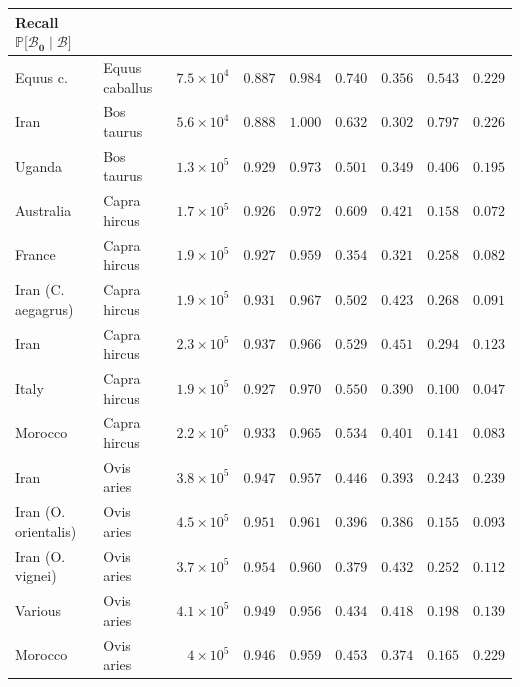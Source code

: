 \documentclass{article}
\newcommand{\proba}{\mathbb{P}}
\newcommand{\SphyBen}{\mathcal{B}_0}
\newcommand{\given}{\mid}
\newcommand{\SpopBen}{\mathcal{B}}
\begin{document}
\begin{center}
\begin{adjustbox}{width=\textwidth}
\begin{tabular}{||l|l|r||r|r||r|r||r|r||}
                \makecell{\textbf{Recall}        \\ $\bm{\proba{[}\SphyBen \given \SpopBen]}$}
                \\   \midrule
                \rowcolor{LIGHTGREY} Equus c. & Equus caballus & $7.5\times 10^{4}$ & $ 0.887$ & $ 0.984$ & $ 0.740$ & $ 0.356$ & $ 0.543$ & $ 0.229$ \\
                Iran & Bos taurus & $5.6\times 10^{4}$ & $ 0.888$ & $ 1.000$ & $ 0.632$ & $ 0.302$ & $ 0.797$ & $ 0.226$ \\
                Uganda & Bos taurus & $1.3\times 10^{5}$ & $ 0.929$ & $ 0.973$ & $ 0.501$ & $ 0.349$ & $ 0.406$ & $ 0.195$ \\
                \rowcolor{LIGHTGREY} Australia & Capra hircus & $1.7\times 10^{5}$ & $ 0.926$ & $ 0.972$ & $ 0.609$ & $ 0.421$ & $ 0.158$ & $ 0.072$ \\
                \rowcolor{LIGHTGREY} France & Capra hircus & $1.9\times 10^{5}$ & $ 0.927$ & $ 0.959$ & $ 0.354$ & $ 0.321$ & $ 0.258$ & $ 0.082$ \\
                \rowcolor{LIGHTGREY} Iran (C. aegagrus) & Capra hircus & $1.9\times 10^{5}$ & $ 0.931$ & $ 0.967$ & $ 0.502$ & $ 0.423$ & $ 0.268$ & $ 0.091$ \\
                \rowcolor{LIGHTGREY} Iran & Capra hircus & $2.3\times 10^{5}$ & $ 0.937$ & $ 0.966$ & $ 0.529$ & $ 0.451$ & $ 0.294$ & $ 0.123$ \\
                \rowcolor{LIGHTGREY} Italy & Capra hircus & $1.9\times 10^{5}$ & $ 0.927$ & $ 0.970$ & $ 0.550$ & $ 0.390$ & $ 0.100$ & $ 0.047$ \\
                \rowcolor{LIGHTGREY} Morocco & Capra hircus & $2.2\times 10^{5}$ & $ 0.933$ & $ 0.965$ & $ 0.534$ & $ 0.401$ & $ 0.141$ & $ 0.083$ \\
                Iran & Ovis aries & $3.8\times 10^{5}$ & $ 0.947$ & $ 0.957$ & $ 0.446$ & $ 0.393$ & $ 0.243$ & $ 0.239$ \\
                Iran (O. orientalis) & Ovis aries & $4.5\times 10^{5}$ & $ 0.951$ & $ 0.961$ & $ 0.396$ & $ 0.386$ & $ 0.155$ & $ 0.093$ \\
                Iran (O. vignei) & Ovis aries & $3.7\times 10^{5}$ & $ 0.954$ & $ 0.960$ & $ 0.379$ & $ 0.432$ & $ 0.252$ & $ 0.112$ \\
                Various & Ovis aries & $4.1\times 10^{5}$ & $ 0.949$ & $ 0.956$ & $ 0.434$ & $ 0.418$ & $ 0.198$ & $ 0.139$ \\
                Morocco & Ovis aries & $ 4\times 10^{5}$ & $ 0.946$ & $ 0.959$ & $ 0.453$ & $ 0.374$ & $ 0.165$ & $ 0.229$ \\

\end{tabular}
\end{adjustbox}
\end{center}
\end{document}

